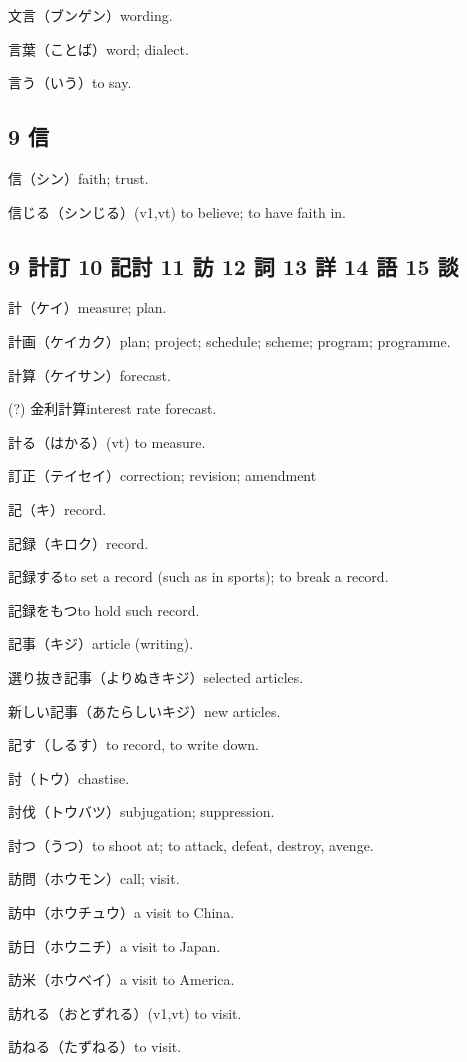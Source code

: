 文言（ブンゲン）wording.

言葉（ことば）word; dialect.

言う（いう）to say.

\subsection{9 信}

信（シン）faith; trust.

信じる（シンじる）(v1,vt) to believe; to have faith in.

\subsection{9 計訂 10 記討 11 訪 12 詞 13 詳 14 語 15 談}

計（ケイ）measure; plan.

計画（ケイカク）plan; project; schedule; scheme; program; programme.

計算（ケイサン）forecast.

(?) 金利計算interest rate forecast.

計る（はかる）(vt) to measure.

訂正（テイセイ）correction; revision; amendment

記（キ）record.

記録（キロク）record.

記録するto set a record (such as in sports); to break a record.

記録をもつto hold such record.

記事（キジ）article (writing).

選り抜き記事（よりぬきキジ）selected articles.

新しい記事（あたらしいキジ）new articles.

記す（しるす）to record, to write down.

討（トウ）chastise.

討伐（トウバツ）subjugation; suppression.

討つ（うつ）to shoot at; to attack, defeat, destroy, avenge.

訪問（ホウモン）call; visit.

訪中（ホウチュウ）a visit to China.

訪日（ホウニチ）a visit to Japan.

訪米（ホウベイ）a visit to America.

訪れる（おとずれる）(v1,vt) to visit.

訪ねる（たずねる）to visit.

